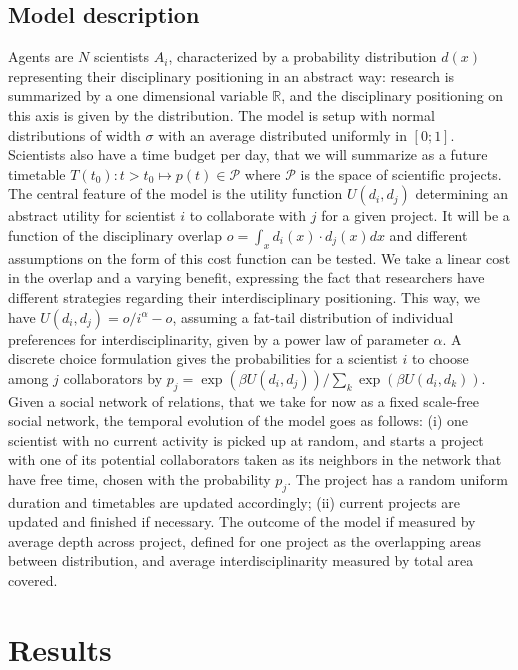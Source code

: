 \documentclass[utf8]{frontiersFPHY} %
\begin{document}
\subsection{Model description}

Agents are $N$ scientists $A_i$, characterized by a probability distribution $d(x)$ representing their disciplinary positioning in an abstract way: research is summarized by a one dimensional variable $\mathbb{R}$, and the disciplinary positioning on this axis is given by the distribution. The model is setup with normal distributions of width $\sigma$ with an average distributed uniformly in $\left[0;1\right]$. Scientists also have a time budget per day, that we will summarize as a future timetable $T(t_0):t>t_0 \mapsto p(t) \in \mathcal{P}$ where $\mathcal{P}$ is the space of scientific projects. The central feature of the model is the utility function $U(d_i,d_j)$ determining an abstract utility for scientist $i$ to collaborate with $j$ for a given project. It will be a function of the disciplinary overlap $o = \int_x d_i(x)\cdot d_j(x) dx$ and different assumptions on the form of this cost function can be tested. We take a linear cost in the overlap and a varying benefit, expressing the fact that researchers have different strategies regarding their interdisciplinary positioning. This way, we have $U(d_i,d_j) = o / i^\alpha - o$, assuming a fat-tail distribution of individual preferences for interdisciplinarity, given by a power law of parameter $\alpha$. A discrete choice formulation gives the probabilities for a scientist $i$ to choose among $j$ collaborators by $p_j = \exp\left(\beta U(d_i,d_j) \right)/\sum_k \exp\left(\beta U(d_i,d_k) \right)$. Given a social network of relations, that we take for now as a fixed scale-free social network, the temporal evolution of the model goes as follows: (i) one scientist with no current activity is picked up at random, and starts a project with one of its potential collaborators taken as its neighbors in the network that have free time, chosen with the probability $p_j$. The project has a random uniform duration and timetables are updated accordingly; (ii) current projects are updated and finished if necessary. The outcome of the model if measured by average depth across project, defined for one project as the overlapping areas between distribution, and average interdisciplinarity measured by total area covered.


\section{Results}
\end{document}
